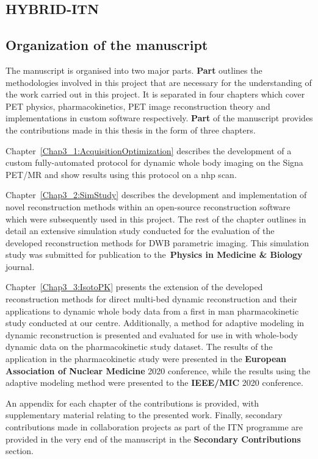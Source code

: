 \subsection*{HYBRID-ITN}


\subsection*{Organization of the manuscript}
The manuscript is organised into two major parts. \textbf{Part } outlines the methodologies involved in this project that are necessary for the understanding of the work carried out in this project. It is separated in four chapters which cover PET physics, pharmacokinetics, PET image reconstruction theory and implementations in custom software respectively. \textbf{Part } of the manuscript provides the contributions made in this thesis in the form of three chapters.

Chapter~\ref{Chap3_1:AcquisitionOptimization} describes the development of a custom fully-automated protocol for dynamic whole body imaging on the Signa PET/MR and show results using this protocol on a \gls{nhp} scan.

Chapter~\ref{Chap3_2:SimStudy} describes the development and implementation of novel reconstruction methods within an open-source reconstruction software which were subsequently used in this project. The rest of the chapter outlines in detail an extensive simulation study conducted for the evaluation of the developed reconstruction methods for DWB parametric imaging. This simulation study was submitted for publication to the~\textbf{Physics in Medicine \& Biology} journal. 

Chapter~\ref{Chap3_3:IsotoPK} presents the extension of the developed reconstruction methods for direct multi-bed dynamic reconstruction and their applications to dynamic whole body data from a first in man pharmacokinetic study conducted at our centre. Additionally, a method for adaptive modeling in dynamic reconstruction is presented and evaluated for use in with whole-body dynamic data on the pharmacokinetic study dataset. The results of the application in the pharmacokinetic study were presented in the \textbf{European Association of Nuclear Medicine} 2020 conference, while the results using the adaptive modeling method were presented to the \textbf{IEEE/MIC} 2020 conference.

An appendix for each chapter of the contributions is provided, with supplementary material relating to the presented work. Finally, secondary contributions made in collaboration projects as part of the ITN programme are provided in the very end of the manuscript in the \textbf{Secondary Contributions} section.